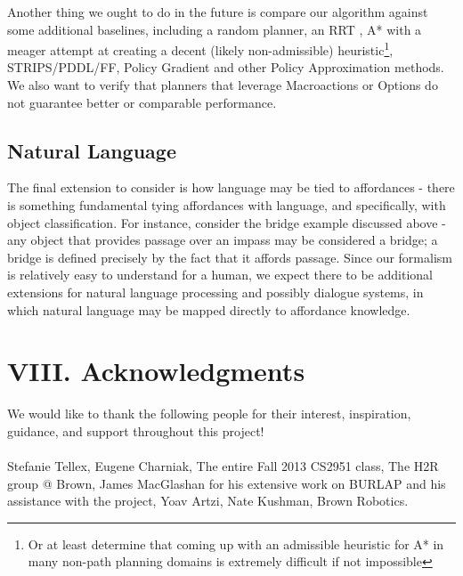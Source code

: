 \documentclass[a4paper]{article}
\begin{document}
Another thing we ought to do in the future is compare our algorithm against some additional baselines, including a random planner, an RRT \cite{LaValle1998}, A* with a meager attempt at creating a decent (likely non-admissible) heuristic\footnote{Or at least determine that coming up with an admissible heuristic for A* in many non-path planning domains is extremely difficult if not impossible}, STRIPS/PDDL/FF, Policy Gradient and other Policy Approximation methods. We also want to verify that planners that leverage Macroactions or Options do not guarantee better or comparable performance.

\subsection{Natural Language}
The final extension to consider is how language may be tied to affordances - there is something fundamental tying affordances with language, and specifically, with object classification. For instance, consider the bridge example discussed above - any object that provides passage over an impass may be considered a bridge; a bridge is defined precisely by the fact that it affords passage. Since our formalism is relatively easy to understand for a human, we expect there to be additional extensions for natural language processing and possibly dialogue systems, in which natural language may be mapped directly to affordance knowledge.

\section{VIII. Acknowledgments}
We would like to thank the following people for their interest, inspiration, guidance, and support throughout this project! \\ \\
Stefanie Tellex,  Eugene Charniak, The entire Fall 2013 CS2951 class, The H2R group @ Brown, James MacGlashan for his extensive work on BURLAP and his assistance with the project, Yoav Artzi, Nate Kushman, Brown Robotics.\cite{Branavan2012}



\end{document}
